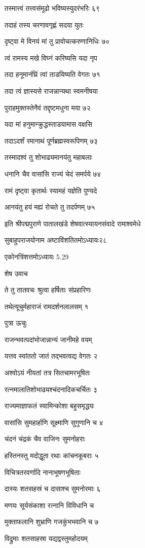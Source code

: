 तस्मात्त्वं तत्त्वसंमूढो भविष्यस्युदरंभरिः ६९

तदाहं तस्य चरणावगृह्णं सदया युतः

दृष्ट्वा मे विनयं मां तु प्रावोचत्करुणानिधिः ७०

त्वं रामस्य मखे विघ्नं करिष्यसि यदा नृप

तदा हनूमानंघ्रिं त्वां ताडयिष्यति वेगतः ७१

तदा त्वं ज्ञास्यसे राजन्नान्यथा स्वमनीषया

पुराहमुक्तस्तेनैवं तद्दृष्टमधुना मया ७२

यदा मां हनुमान्क्रुद्धस्ताडयामास वक्षसि

तदाऽदर्शं रमानाथं पूर्णब्रह्मस्वरूपिणम् ७३

तस्मादश्वं तु शोभाढ्यमानयंतु महाबलाः

धनानि चैव वासांसि राज्यं चेदं समर्पये ७४

रामं दृष्ट्वा कृतार्थः स्यामहं यज्ञेति पुण्यदे

आनयंतु हयं मह्यं रोचते तु तदर्पणम् ७५

इति श्रीपद्मपुराणे पातालखंडे शेषवात्स्यायनसंवादे रामाश्वमेधे

सुबाहुपराजयोनाम अष्टाविंशतितमोऽध्यायः२८

एकोनत्रिंशत्तमोऽध्यायः 5.29

शेष उवाच

ते तु तातवचः श्रुत्वा हर्षिताः संप्रहारिणः

तथेत्यूचुर्महाराजं रामदर्शनलालसम् १

पुत्रा ऊचुः

राजन्भवत्पदांभोजान्नान्यं जानीमहे वयम्

यत्तव स्वांततो जातं तद्भवत्वद्य वेगतः २

अश्वोऽयं नीयतां तत्र सितचामरभूषितः

रत्नमालातिशोभाढ्यश्चंदनादिकचर्चितः ३

राज्यमाज्ञाफलं स्वामिन्कोशा बहुसमृद्धयः

वासांसि सुमहार्हाणि सूक्ष्माणि सुगुणानि च ४

चंदनं चंद्रकं चैव वाजिनः सुमनोहराः

हस्तिनस्तु मदोद्धूता रथाः कांचनकूबराः ५

विचित्रतरवर्णादि नानाभूषणभूषिताः

दास्यः शतसहस्रं च दासाश्च सुमनोरमाः ६

मणयः सूर्यसंकाशा रत्नानि विविधानि च

मुक्ताफलानि शुभ्राणि गजकुंभभवानि च ७

विद्रुमाः शतसाहस्रा यद्यद्वस्तुमहोदयम्

